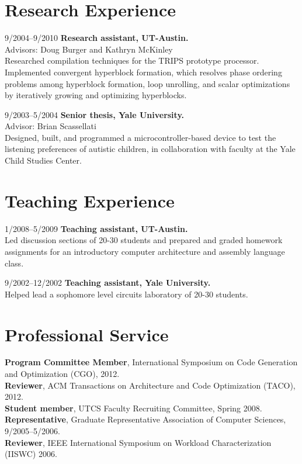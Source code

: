 \documentclass[11pt]{article}
\begin{document}
\section{Research Experience}
\begin{CV}
\item[9/2004--9/2010] \textbf{Research assistant, UT-Austin.} \\
Advisors: Doug Burger and Kathryn McKinley \\
Researched compilation techniques for the TRIPS prototype processor.  Implemented convergent hyperblock formation, which resolves phase ordering problems among hyperblock formation, loop unrolling, and scalar optimizations by iteratively growing and optimizing hyperblocks.

\item[9/2003--5/2004] \textbf{Senior thesis, Yale University.} \\
Advisor: Brian Scassellati \\
Designed, built, and programmed a microcontroller-based device to test the listening preferences of autistic children, in collaboration with faculty at the Yale Child Studies Center.
\end{CV}

\section{Teaching Experience}
\begin{CV}
\item[1/2008--5/2009] \textbf{Teaching assistant, UT-Austin.} \\
Led discussion sections of 20-30 students and prepared and graded homework assignments for an introductory computer architecture and assembly language class.
\item[9/2002--12/2002] \textbf{Teaching assistant, Yale University.} \\
Helped lead a sophomore level circuits laboratory of 20-30 students.
\end{CV}

\section{Professional Service}
\noindent
\textbf{Program Committee Member}, International Symposium on Code Generation and Optimization (CGO), 2012.\\
\textbf{Reviewer}, ACM Transactions on Architecture and Code Optimization (TACO), 2012.\\
\textbf{Student member}, UTCS Faculty Recruiting Committee, Spring 2008.\\
\textbf{Representative}, Graduate Representative Association of Computer Sciences, 9/2005--5/2006.\\
\textbf{Reviewer}, IEEE International Symposium on Workload Characterization (IISWC) 2006.
\end{document}
